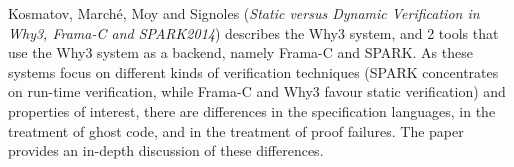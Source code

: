 

Kosmatov, March\'{e}, Moy and Signoles
\cite{isola-2016-kosmatov}
({\em Static versus Dynamic Verification in 
      Why3, Frama-C and SPARK2014})
describes the Why3 system, and 2 tools that use the Why3 system as a
backend, namely Frama-C and SPARK. As these systems focus on different
kinds of verification techniques (SPARK concentrates on run-time
verification, while Frama-C and Why3 favour static verification) and
properties of interest, there are differences in the specification
languages, in the treatment of ghost code, and in the treatment of
proof failures. The paper provides an in-depth discussion of these differences.
